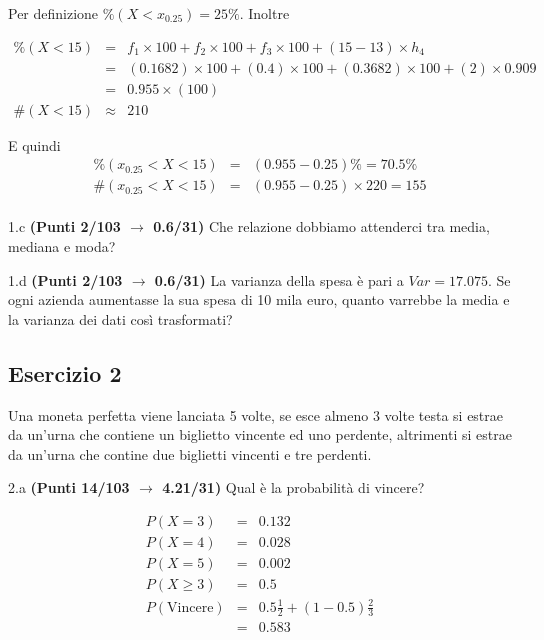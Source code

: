 \documentclass[
  11pt,
]{book}
\theoremstyle{mytheoremstyle}
\theoremstyle{mydefstyle}
\newenvironment{sol}
  {
  \begin{tcolorbox}[enhanced,breakable,arc=0.1mm,boxrule=1pt,colback=white,colframe=iblue,
  title=\bf \fontfamily{lmss}\selectfont \hspace{.5 cm} Soluzione,drop fuzzy shadow]

}{
\end{tcolorbox}
  }
\begin{document}
\begin{sol}
Per definizione \(\%(X<x_{ 0.25 })= 25 \%\). Inoltre

\begin{eqnarray*}
   \%(X< 15 ) &=&  f_{ 1 }\times 100+f_{ 2 }\times 100+f_{ 3 }\times 100 +( 15 - 13 )\times h_{ 4 } \\
                &=&  ( 0.1682 )\times 100+( 0.4 )\times 100+( 0.3682 )\times 100 +( 2 )\times  0.909  \\
                &=&  0.955 \times(100) \\
\#(X< 15 )    &\approx& 210 
\end{eqnarray*}

E quindi
\begin{eqnarray*}
   \%( x_{0.25} < X < 15 ) &=& ( 0.955 - 0.25 )\%= 70.5 \% \\
   \#( x_{0.25} < X < 15 ) &=& ( 0.955 - 0.25 )\times  220 = 155  \\
\end{eqnarray*}

\end{sol}

1.c \textbf{(Punti 2/103 \(\rightarrow\) 0.6/31)} Che relazione dobbiamo attenderci tra media, mediana e moda?

1.d \textbf{(Punti 2/103 \(\rightarrow\) 0.6/31)} La varianza della spesa è pari a \(Var=17.075\).
Se ogni azienda aumentasse la sua spesa di 10 mila euro, quanto varrebbe la media e la varianza dei dati così trasformati?

\subsection{Esercizio 2}\label{esercizio-2-15}

Una moneta perfetta viene lanciata 5 volte, se esce almeno 3 volte testa si estrae da un'urna che contiene
un biglietto vincente ed uno perdente, altrimenti si estrae da un'urna che contine due biglietti vincenti e tre perdenti.

2.a \textbf{(Punti 14/103 \(\rightarrow\) 4.21/31)} Qual è la probabilità di vincere?

\begin{sol}
\begin{eqnarray*}
  P(X=3) &=& 0.132\\
  P(X=4) &=& 0.028\\
  P(X=5) &=& 0.002\\
  P(X\ge 3)  &=& 0.5\\
  P(\text{Vincere})&=& 0.5\frac12+(1-0.5)\frac23\\
  &=& 0.583
\end{eqnarray*}

\end{sol}
\end{document}
